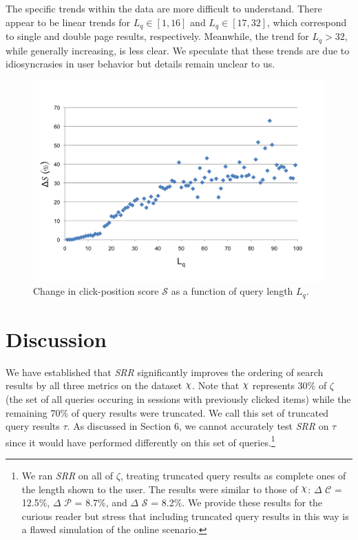 \documentclass{article}
\def\Chi{\raisebox{2pt}{$\chi$}}
\begin{document}
The specific trends within the data are more difficult to understand. There appear
to be linear trends for $L_q \in [1,16]$ and $L_q \in [17,32]$, which
correspond to single and double page results, respectively. Meanwhile, the
trend for $L_q > 32$, while generally increasing, is less clear. We speculate
that these trends are due to idiosyncrasies in user behavior but details remain
unclear to us.

\begin{figure}[htbp!]
    \centering
    \includegraphics[width=\textwidth]{scorebylen.png}
    \caption{Change in click-position score $\mathscr{S}$ as a function of query length $L_q$.}
    \label{fig:click_position_score_vs_query_length}
\end{figure}

\section{Discussion}

We have established that {\em SRR} significantly improves the ordering
of search results by all three metrics on the dataset $\Chi$. Note that $\Chi$
represents 30\% of $\zeta$ (the set of all queries occuring in sessions with
previously clicked items) while the remaining 70\% of query results were truncated. 
We call this set of truncated query results $\tau$. As discussed in Section 6, 
we cannot accurately test {\em SRR} on $\tau$ since it would have performed 
differently on this set of queries.\footnote{We ran {\em SRR} on all of
$\zeta$, treating truncated query results as complete ones of the length shown to the
user.  The results were similar to those of $\Chi$:
$\Delta$ $\mathscr{C}$ = 12.5\%, $\Delta$ $\mathscr{P}$ = 8.7\%, and $\Delta$
$\mathscr{S}$ = 8.2\%. We provide these results for the curious reader but stress
that including truncated query results in this way is a flawed simulation of the
online scenario.}
\end{document}
